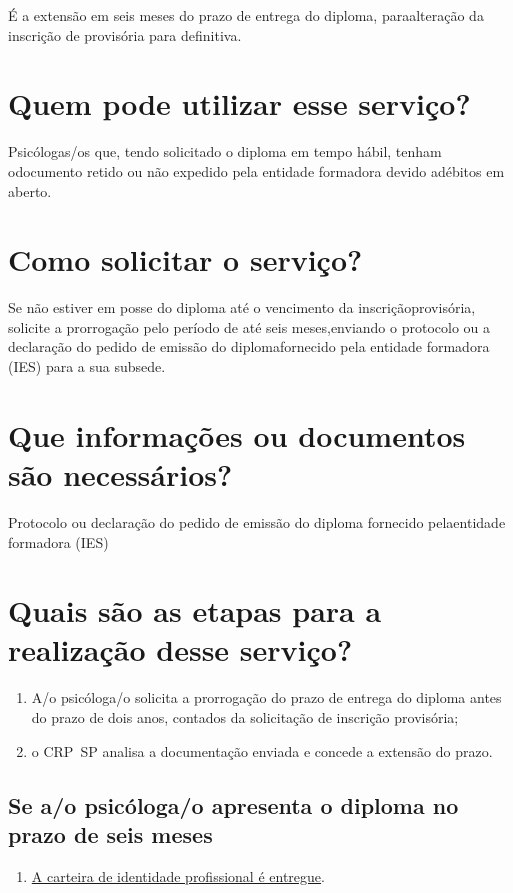 É a extensão em seis meses do prazo de entrega do diploma, paraalteração da inscrição de provisória para definitiva.

\section{Quem pode utilizar esse serviço?}

Psicólogas/os que, tendo solicitado o diploma em tempo hábil, tenham odocumento retido ou não expedido pela entidade formadora devido adébitos em aberto.

\section{Como solicitar o serviço?}

Se não estiver em posse do diploma até o vencimento da inscriçãoprovisória, solicite a prorrogação pelo período de até seis meses,enviando o protocolo ou a declaração do pedido de emissão do diplomafornecido pela entidade formadora (IES) para a sua subsede.

\section{Que informações ou documentos são necessários?}

Protocolo ou declaração do pedido de emissão do diploma fornecido pelaentidade formadora (IES)

\section{Quais são as etapas para a realização desse serviço?}

\begin{enumerate}
  \item  A/o psicóloga/o solicita a prorrogação do prazo de entrega do diploma  antes do prazo de dois anos, contados da solicitação de inscrição  provisória;
  \item  o CRP~SP analisa a documentação enviada e concede a extensão do prazo.
\end{enumerate}

\subsection{Se a/o psicóloga/o apresenta o diploma no prazo de seis meses}

\begin{enumerate}
  \item  \hyperref[]{A  carteira de identidade profissional é entregue}.
\end{enumerate}

